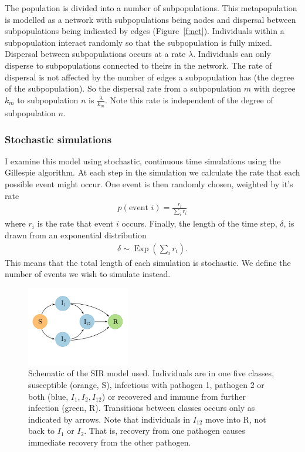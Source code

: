 The population is divided into a number of subpopulations.
This metapopulation is modelled as a network with subpopulations being nodes and dispersal between subpopulations being indicated by edges (Figure~\ref{f:net}).
Individuals within a subpopulation interact randomly so that the subpopulation is fully mixed.
Dispersal between subpopulations occurs at a rate $\lambda$.
Individuals can only disperse to subpopulations connected to theirs in the network.
The rate of dispersal is not affected by the number of edges a subpopulation has (the degree of the subpopulation).
So the dispersal rate from a subpopulation $m$ with degree $k_m$ to subpopulation $n$ is $\frac{\lambda}{k_m}$.
Note this rate is independent of the degree of subpopulation $n$.





\subsubsection{Stochastic simulations}

I examine this model using stochastic, continuous time simulations using the Gillespie algorithm.
At each step in the simulation we calculate the rate that each possible event might occur.
One event is then randomly chosen, weighted by it's rate
\begin{align}
  p(\text{event } i) = \frac{r_i}{\sum_i r_i}
\end{align}
where $r_i$ is the rate that event $i$ occurs.
Finally, the length of the time step, $\delta$, is drawn from an exponential distribution 
\begin{align}
  \delta \sim \operatorname{Exp}\left(\sum_i r_i  \right).
\end{align}
This means that the total length of each simulation is stochastic. 
We define the number of events we wish to simulate instead.


\begin{figure}[t]
\centering
  \includegraphics[width=0.4\textwidth]{imgs/SIRoption1.pdf}
  \caption[Schematic of the SIR model used]{
Schematic of the SIR model used. 
Individuals are in one five classes, susceptible (orange, S), infectious with pathogen 1, pathogen 2 or both (blue, $I_1, I_2, I_{12}$) or recovered and immune from further infection (green, R).
Transitions between classes occurs only as indicated by arrows.
Note that individuals in $I_{12}$ move into R, not back to $I_1$ or $I_2$. 
That is, recovery from one pathogen causes immediate recovery from the other pathogen.
}
  \label{f:sir}
\end{figure}


